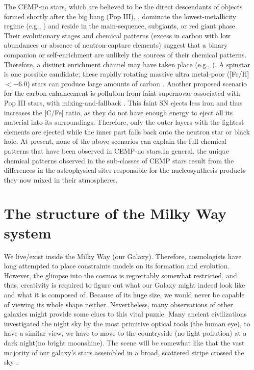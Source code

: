 The CEMP-no stars, which are believed to be the direct descendants of objects
formed shortly after the big bang (Pop III), \citep{2013ApJ...773...33I,
2014ApJ...790...34P,2016A&A...586A.160H}, dominate the lowest-metallicity regime
(e.g., \citealt{2002Natur.419..904C, 2005Natur.434..871F, 2011Natur.477...67C,
2014Natur.506..463K, 2018MNRAS.481.3838S}) and reside in the main-sequence,
subgiants, or red giant phase.  Their evolutionary stages and chemical patterns
(excess in carbon with low abundances or absence of neutron-capture elements)
suggest that a binary companion or self-enrichment are unlikely the sources of
their chemical patterns. Therefore, a distinct enrichment channel may have
taken place (e.g., \citealt{2014MNRAS.441.1217S, 2016A&A...588A...3H}).
A spinstar is one possible candidate; these rapidly rotating
massive ultra metal-poor ([Fe/H] $< -6.0$) stars can produce large
amounts of carbon \citep{2006A&A...447..623M, 2007A&A...461..571H,
2012A&A...538L...2F, 2015A&A...576A..56M}.  Another proposed scenario for the
carbon enhancement is pollution from faint supernovae associated with Pop III
stars, with mixing-and-fallback \citep{2003Natur.422..871U,
2007ApJ...660..516T, 2010ApJ...724..341H, 2013ARA&A..51..457N,
2014ApJ...785...98T,2019arXiv190403211E}. This faint SN ejects less iron and
thus increases the [C/Fe] ratio, as they do not have enough energy to eject all
its material into its surroundings. Therefore, only the outer layers with the
lightest elements are ejected while the inner part falls back onto the neutron
star or black hole.  At present, none of the above scenarios can explain the
full chemical patterns that have been observed in CEMP-no stars.In
general, the unique chemical patterns observed in the sub-classes of CEMP stars
result from the differences in the astrophysical sites responsible for the
nucleosynthesis products they now mixed in their atmospheres.




\section{The structure of the Milky Way system}


We live/exist inside the Milky Way (our Galaxy). Therefore, cosmologists have long attempted to place constraints models on its formation and evolution. However, the glimpse into the cosmos is regrettably somewhat restricted, and thus, creativity is required to figure out what our Galaxy might indeed look like and what it is composed of. Because of its huge size, we would never be capable of viewing its whole shape neither. Nevertheless,  many observations of other galaxies \citep[e.g.,][Andromeda galaxy,]{2005ApJ...635L..37R} might provide some clues to this vital puzzle. Many ancient civilizations investigated the night sky by the most primitive optical tools (the human eye), to have a similar view, we have to move to the countryside (no light pollution) at a dark night(no bright moonshine). The scene will be somewhat like that the vast majority of our galaxy's stars assembled in a broad, scattered stripe crossed the sky \citep{2015hae..book.1549J}. 

